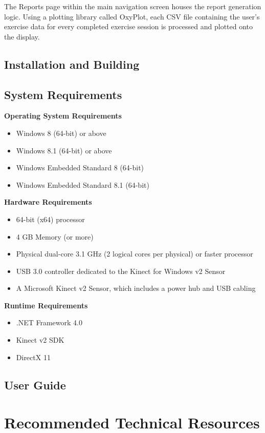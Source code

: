 \documentclass[onecolumn, draftclsnofoot,10pt, compsoc]{IEEEtran}
\begin{document}
The Reports page within the main navigation screen houses the report generation logic. Using a plotting library called OxyPlot, each CSV file containing the user's exercise data for every completed exercise session is processed and plotted onto the display.

\subsection{Installation and Building}

\subsection{System Requirements}
\textbf{Operating System Requirements}
\begin{itemize}
    \item Windows 8 (64-bit) or above
    \item Windows 8.1 (64-bit) or above
    \item Windows Embedded Standard 8 (64-bit)
    \item Windows Embedded Standard 8.1 (64-bit)
\end{itemize}
\textbf{Hardware Requirements}
\begin{itemize}
    \item 64-bit (x64) processor
    \item 4 GB Memory (or more)
    \item Physical dual-core 3.1  GHz (2 logical cores per physical) or faster processor
    \item USB 3.0 controller dedicated to the Kinect for Windows v2 Sensor
    \item A Microsoft Kinect v2 Sensor, which includes a power hub and USB cabling
\end{itemize}
\textbf{Runtime Requirements}
\begin{itemize}
    \item .NET Framework 4.0
    \item Kinect v2 SDK
    \item DirectX 11
\end{itemize}
\subsection{User Guide}
\section{Recommended Technical Resources}
\end{document}
